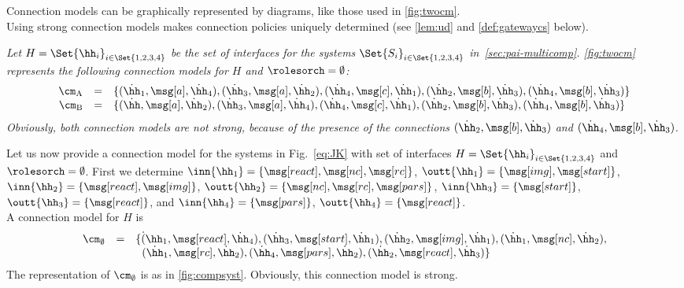  
 \noindent
Connection models can be graphically represented by diagrams, like those used in \cref{fig:twocm}. \\

Using strong connection models makes connection policies  %
uniquely determined (see \cref{lem:ud} and \cref{def:gatewaycs} below). 


\begin{example}\label{ex:scm}
{\em
Let $H=\Set{\hh_i}_{i\in \Set{1,2,3,4}}$ be the set of interfaces for the systems $\Set{S_i}_{i\in\Set{1,2,3,4}}$ %
in~\cref{sec:pai-multicomp}. 
\cref{fig:twocm} %
represents the following connection models for $H$ and $\rolesorch=\emptyset$:
$$
\begin{array}{rcl}
\cm_{\text{A}}& = &\{ 
(\dot\hh_1,\msg[a],\dot\hh_4), (\dot\hh_3,\msg[a],\dot\hh_2),(\dot\hh_4,\msg[c],\dot\hh_1),(\dot\hh_2,\msg[b],\dot\hh_3), (\dot\hh_4,\msg[b],\dot\hh_3) \}\\
\cm_{\text{B}} & = &\{ 
(\dot\hh,\msg[a],\dot\hh_2), (\dot\hh_3,\msg[a],\dot\hh_4),(\dot\hh_4,\msg[c],\dot\hh_1),(\dot\hh_2,\msg[b],\dot\hh_3), (\dot\hh_4,\msg[b],\dot\hh_3)
\}
\end{array}
$$
 Obviously, both connection models 
are not strong, because of the presence of the connections $(\dot\hh_2,\msg[b],\dot\hh_3)$ and $(\dot\hh_4,\msg[b],\dot\hh_3)$. 

\smallskip

 Let us now provide a connection model for the systems in Fig.\ \ref{eq:JK}
with set of interfaces $H = \Set{\hh_i}_{i\in \Set{1,2,3,4}}$ and $\rolesorch=\emptyset$. 
First we determine $\inn{\hh_1} = \{\msg[react], \msg[nc], \msg[rc]\}$,
$\outt{\hh_1} = \{\msg[img], \msg[start]\}$,
$\inn{\hh_2} = \{\msg[react], \msg[img]\}$,\linebreak
$\outt{\hh_2} = \{\msg[nc], \msg[rc], \msg[pars]\}$,
$\inn{\hh_3} = \{\msg[start]\}$,
$\outt{\hh_3} = \{\msg[react]\}$, and
$\inn{\hh_4} = \{\msg[pars]\}$,
$\outt{\hh_4} = \{\msg[react]\}$.  \\
A connection model for $H$ is\\[1mm]
$$
\begin{array}{rcl}
\cm_{\emptyset} & = &\{ 
\dot(\hh_1,\msg[react],\dot\hh_4), (\dot\hh_3,\msg[start],\dot\hh_1),(\dot\hh_2,\msg[img],\dot\hh_1), 
(\dot\hh_1,\msg[nc],\dot\hh_2), \\
& & \hspace{2mm} (\dot\hh_1,\msg[rc],\dot\hh_2), (\dot\hh_4,\msg[pars],\dot\hh_2), 
(\dot\hh_2,\msg[react],\dot\hh_3)
\}
\end{array}
$$
The representation of $\cm_{\emptyset}$ is as in \cref{fig:compsyst}.
Obviously, this connection model is strong.

}
\end{example}
